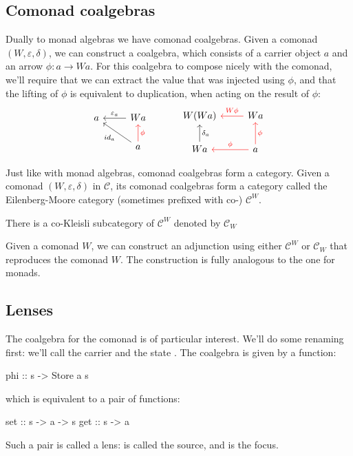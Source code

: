 \documentclass[DaoFP]{subfiles}
\begin{document}
\subsection{Comonad coalgebras}

Dually to monad algebras we have comonad coalgebras. Given a comonad $(W, \varepsilon, \delta)$, we can construct a coalgebra, which consists of a carrier object $a$ and an arrow $\phi \colon a \to W a$. For this coalgebra to compose nicely with the comonad, we'll require that we can extract the value that was injected using $\phi$, and that the lifting of $\phi$ is equivalent to duplication, when acting on the result of $\phi$:
\[
 \begin{tikzcd}
 a
 & W a
 \arrow[l, "\varepsilon_a"']
 \\
 & a
 \arrow[ul, "id_a"]
\arrow[u, red, "\phi"']
 \end{tikzcd}
  \hspace{30pt}
 \begin{tikzcd}
W(W a) 
&W a
\arrow[l, red, "W \phi "']
\\
W a
\arrow[u, "\delta_a"']
& a
\arrow[l, red, "\phi"']
\arrow[u, red, "\phi"']
 \end{tikzcd}
\]

Just like with monad algebras, comonad coalgebras form a category. Given a comonad $(W, \varepsilon, \delta)$ in $\mathcal{C}$, its comonad coalgebras form a category called the Eilenberg-Moore category (sometimes prefixed with co-) $\mathcal{C}^W$.

There is a co-Kleisli subcategory of $\mathcal{C}^W$ denoted by $\mathcal{C}_W$

Given a comonad $W$, we can construct an adjunction using either $\mathcal{C}^W$ or $\mathcal{C}_W$ that reproduces the comonad $W$. The construction is fully analogous to the one for monads.

\subsection{Lenses}

The coalgebra for the  comonad is of particular interest. We'll do some renaming first: we'll call the carrier  and the state . The coalgebra is given by a function:
\begin{haskell}
phi :: s -> Store a s
\end{haskell}
which is equivalent to a pair of functions:
\begin{haskell}
set :: s -> a -> s
get :: s -> a
\end{haskell}
Such a pair is called a lens:  is called the source, and  is the focus. 
\end{document}

